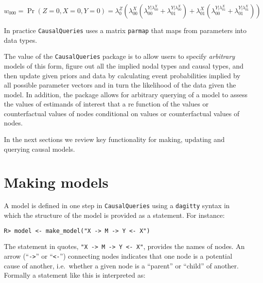 \documentclass[
  11pt,
  article]{jss}
\begin{document}
\[w_{000}=\Pr(Z=0, X=0, Y=0) = \lambda^Z_0\left(\lambda^X_{00}(\lambda^{Y|\lambda^X_{00}}_{00}+\lambda^{Y|\lambda^X_{00}}_{01}) + \lambda^X_{01}(\lambda^{Y|\lambda^X_{01}}_{00}+\lambda^{Y|\lambda^X_{01}}_{01})\right)\]

In practice \texttt{CausalQueries} uses a matrix \texttt{parmap} that
maps from parameters into data types.

The value of the \texttt{CausalQueries} package is to allow users to
specify \emph{arbitrary} models of this form, figure out all the implied
nodal types and causal types, and then update given priors and data by
calculating event probabilities implied by all possible parameter
vectors and in turn the likelihood of the data given the model. In
addition, the package allows for arbitrary querying of a model to assess
the values of estimands of interest that a re function of the values or
counterfactual values of nodes conditional on values or counterfactual
values of nodes.

In the next sections we review key functionality for making, updating
and querying causal models.

\hypertarget{sec-make}{%
\section{Making models}\label{sec-make}}

A model is defined in one step in \texttt{CausalQueries} using a
\texttt{dagitty} syntax \citep{textor_robust_2016} in which the
structure of the model is provided as a statement. For instance:

\begin{verbatim}
R> model <- make_model("X -> M -> Y <- X")
\end{verbatim}

The statement in quotes,
\texttt{"X\ -\textgreater{}\ M\ -\textgreater{}\ Y\ \textless{}-\ X"},
provides the names of nodes. An arrow (``\texttt{-\textgreater{}}'' or
``\texttt{\textless{}-}'') connecting nodes indicates that one node is a
potential cause of another, i.e.~whether a given node is a ``parent'' or
``child'' of another. Formally a statement like this is interpreted as:
\end{document}
